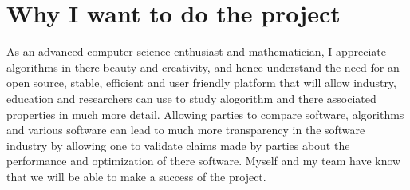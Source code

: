 \documentclass[11pt,a4paper,sans]{moderncv} %
\begin{document}

\section{Why I want to do the project}
As an advanced computer science enthusiast and mathematician, I appreciate algorithms in there beauty and creativity, and hence understand the need for an open source, stable, efficient and user friendly platform that will allow industry, education and researchers can use to study alogorithm and there associated properties in much more detail. Allowing parties to compare software, algorithms and various software can lead to much more transparency in the software industry by allowing one to validate claims made by parties about the performance and optimization of there software. Myself and my team have know that we will be able to make a success of the project.

\end{document}
